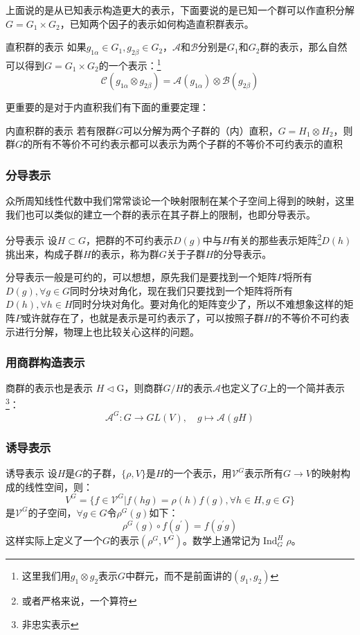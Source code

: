 上面说的是从已知表示构造更大的表示，下面要说的是已知一个群可以作直积分解$G=G_1\times G_2$，已知两个因子的表示如何构造直积群表示。
\begin{define}{直积群的表示}
	如果$g_{1\alpha}\in G_1,g_{2\beta}\in G_2$，$\mathscr{A}$和$\mathscr{B}$分别是$G_1$和$G_2$群的表示，那么自然可以得到$G=G_1\times G_2$的一个表示：\footnote{这里我们用$g_1\otimes g_2$表示$G$中群元，而不是前面讲的$(g_1,g_2)$}
	\[\mathscr{C}(g_{1\alpha}\otimes g_{2\beta})=\mathscr{A}(g_{1\alpha})\otimes\mathscr{B}(g_{2\beta})\]
\end{define}
更重要的是对于内直积我们有下面的重要定理：
\begin{theorem}{内直积群的表示}
	若有限群$G$可以分解为两个子群的（内）直积，$G=H_1\otimes H_2$，则群$G$的所有不等价不可约表示都可以表示为两个子群的不等价不可约表示的直积
\end{theorem}

\subsubsection{分导表示}
众所周知线性代数中我们常常谈论一个映射限制在某个子空间上得到的映射，这里我们也可以类似的建立一个群的表示在其子群上的限制，也即分导表示。
\begin{define}{分导表示}
	设$H\subset G$，把群的不可约表示$D(g)$中与$H$有关的那些表示矩阵\footnote{或者严格来说，一个算符}$D(h)$挑出来，构成子群$H$的表示，称为群$G$关于子群$H$的分导表示。
\end{define}

分导表示一般是可约的，可以想想，原先我们是要找到一个矩阵$P$将所有$D(g),\forall g\in G$同时分块对角化，现在我们只要找到一个矩阵将所有$D(h),\forall h\in H$同时分块对角化。要对角化的矩阵变少了，所以不难想象这样的矩阵$P$或许就存在了，也就是表示是可约表示了，可以按照子群$H$的不等价不可约表示进行分解，物理上也比较关心这样的问题。

\subsubsection{用商群构造表示}
\begin{theorem}{商群的表示也是表示}
	$H\lhd$G，则商群$G/H$的表示$\mathscr{A}$也定义了$G$上的一个简并表示\footnote{非忠实表示}：\[\mathscr{A}^G:G\to GL(V),\quad g\mapsto \mathscr{A}(gH)\]
\end{theorem}

\subsubsection*{诱导表示}
\begin{define}{诱导表示}
	设$H$是$G$的子群，$\{\rho,V\}$是$H$的一个表示，用$\mathcal{V}^G$表示所有$G\to V$的映射构成的线性空间，则：
	\[V^G=\{f\in\mathcal{V}^G|f(hg)=\rho(h)f(g),\forall h\in H,g\in G\}\]
	是$\mathcal{V}^G$的子空间，$\forall g\in G$令$\rho^G(g)$如下：
	\[\rho^G(g)\circ f(g^\prime)=f(g^\prime g)\]
	这样实际上定义了一个$G$的表示$(\rho^G,V^G)$。数学上通常记为$\operatorname{Ind}_G^H\rho$。
\end{define}



